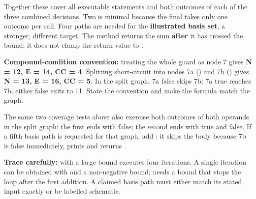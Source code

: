 \begin{studycolumns}
\vspace{0pt}

Together these cover all executable statements and both outcomes of each of the three combined decisions. Two is minimal because the final  takes only one outcome per call. Four paths are needed for the \textbf{illustrated basis set}, a stronger, different target. The method returns the sum \textbf{after} it has crossed the bound; it does not clamp the return value to .

\textbf{Compound-condition convention:} treating the whole  guard as node 7 gives \textbf{N = 12, E = 14, CC = 4}. Splitting short-circuit \code{\&\&} into nodes 7a () and 7b () gives \textbf{N = 13, E = 16, CC = 5}. In the split graph, 7a false skips 7b; 7a true reaches 7b; either false exits to 11. State the convention and make the formula match the graph.

The same two coverage tests above also exercise both outcomes of both operands in the split graph: the first ends with  false; the second ends with  true and  false. If a fifth basis path is requested for that graph, add : it skips the body because 7b is false immediately, prints  and returns .

\textbf{Trace carefully:}  with a large bound executes four iterations. A single iteration can be obtained with  and a non-negative bound;  needs a bound that stops the loop after the first addition. A claimed basis path must either match its stated input exactly or be labelled schematic.
\end{studycolumns}
